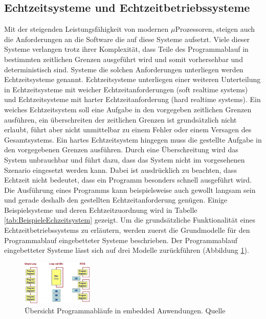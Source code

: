 \subsection{Echtzeitsysteme und Echtzeitbetriebssysteme}
\label{sec:Echtzeitsysteme}
Mit der steigenden Leis\-tungs\-fähig\-keit von modernen $\mu$\-Pro\-zesso\-ren, steigen auch die Anforderungen an die Software die auf diese Systeme aufsetzt. Viele dieser Systeme verlangen trotz ihrer Komplexität, dass Teile des Programmablauf in bestimmten zeitlichen Grenzen ausgeführt wird und somit vorhersehbar und deterministisch sind. Systeme die solchen Anforderungen unterliegen werden Echtzeitsysteme genannt.   Echtzeitsysteme unterliegen einer weiteren Unterteilung in Echtzeitsysteme mit weicher Echtzeitanforderungen (soft realtime systems) und Echtzeitsysteme mit harter Echtzeitanforderung (hard realtime systems). Ein weiches Echtzeitsystem soll eine Aufgabe in den vorgegeben zeitlichen Grenzen ausführen, ein über\-schreiten der zeitlichen Grenzen ist grundsätzlich nicht erlaubt, führt aber nicht unmittelbar zu einem Fehler oder einem Versagen des Gesamtsystems. Ein hartes Echtzeitsystem hingegen muss die gestellte Aufgabe in den vorgegebenen Grenzen aus\-füh\-ren. Durch eine Überschreitung wird das System unbrauchbar und führt dazu, dass das System nicht im vorgesehenen Szenario eingesetzt werden kann. Dabei ist ausdrücklich zu beachten, dass Echtzeit nicht bedeutet, dass ein Programm besonders schnell ausgeführt wird. Die Ausführung eines Programms kann beispielsweise auch gewollt langsam sein und gerade deshalb den gestellten Echtzeitanforderung genügen. Einige Beispielsysteme und deren Echtzeitzuordnung wird in Tabelle \ref{tab:BeispieleEchzeitsystem} gezeigt. Um die grund\-sätz\-liche Funktionalität eines Echtzeitbetriebssystems zu erläutern, werden zuerst die Grundmodelle für den Programmablauf eingebetteter Systeme beschrieben. Der Programmablauf eingebetteter Systeme lässt sich auf drei Modelle zu\-rück\-füh\-ren (Abbildung \ref{fig:Programmablauf}). 
\begin{figure}[ht]
	\centering
		\includegraphics[width=0.3\textwidth]{Pictures/EmbeddedCom/cwrtos2f5c.jpg}
	\caption{Übersicht Programmabläufe in embedded Anwendungen. Quelle~\protect{}}
	\label{fig:Programmablauf}
\end{figure}
